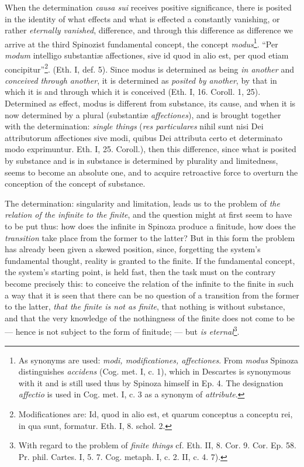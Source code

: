 \documentclass[12pt,a4paper,openany]{book}
\newcommand{\opage}[1]{\marginnote{\footnotesize\textit{[#1]}}}
\begin{document}
When the determination \emph{causa sui} receives positive significance, there is posited
in the identity of what effects and what is effected a constantly
vanishing, or rather \emph{eternally vanished}, difference, and
through this difference as difference we arrive at the third
Spinozist fundamental concept, the concept \emph{modus}\footnote{As
synonyms are used: \emph{modi, modificationes, affectiones}. From \emph{modus}
Spinoza distinguishes \emph{accidens} (Cog. met. I, c. 1), which in Descartes is
synonymous with it and is still used thus by Spinoza himself in Ep. 4.
The designation \emph{affectio} is used in Cog. met. I, c. 3 as a synonym of
\emph{attribute}.}. ``Per \emph{modum} intelligo substantiæ affectiones, sive id
quod in alio est, per quod etiam concipitur''\footnote{Modificationes
are: Id, quod in alio est, et quarum conceptus a conceptu rei, in qua
sunt, formatur. Eth. I, 8. schol. 2.}. (Eth. I, def. 5). Since modus is
determined as being \emph{in another} and \emph{conceived through another}, it is
determined as \emph{posited by another}, by that in which it is and through
which it is conceived (Eth. I, 16. Coroll. 1, 25). Determined as effect,
modus is different from substance, its cause, and when it is now
determined by a plural (substantiæ \emph{affectiones}), and is brought
together with the determination: \emph{single things} (\emph{res particulares}
nihil sunt nisi Dei attributorum affectiones sive modi, quibus Dei
attributa certo et determinato modo exprimuntur. Eth. I, 25. Coroll.),
then this difference, since what is posited by substance and is in
substance is determined by plurality and limitedness, seems to become an
absolute one, and to acquire retroactive force to overturn the conception of the
concept of substance.

The determination: singularity and limitation, leads us to the problem of
\emph{the relation of the infinite to the finite}, and the question might
at first seem to have to
\opage{55} be put thus: how does the infinite in Spinoza produce a
finitude, how does the \emph{transition} take place from the former to
the latter? But in this form the problem has already been given a skewed
position, since, forgetting the system's fundamental thought,
reality is granted to the finite. If the fundamental concept, the system's
starting point, is held fast, then the task must on the contrary become precisely this:
to conceive the
relation of the infinite to the finite in such a way that it is seen that there
can be no question of a transition from the former to the latter, \emph{that the
finite is not as finite}, that nothing is without substance,
and that the very knowledge of the nothingness of the finite does not come to be ---
hence is not subject to the form of finitude; --- but \emph{is
eternal}\footnote{With regard to the problem of \emph{finite things} cf. Eth.
II, 8. Cor. 9. Cor. Ep. 58. Pr. phil. Cartes. I, 5. 7. Cog. metaph. I,
c. 2. II, c. 4. 7).}.
\end{document}
